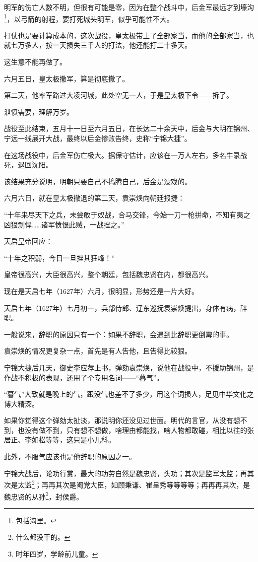 \begin{multicols}{\theparacolNo}
		明军的伤亡人数不明，但很有可能是零，因为在整个战斗中，后金军最远才到壕沟\footnote{包括沟里。}，以弓箭的射程，要打死城头明军，似乎可能性不大。

		打仗也是要计算成本的，这次战役，皇太极带上了全部家当，而他的全部家当，也就七万多人，按一天损失三千人的打法，他还能打二十多天。

		这生意不能再做了。

		六月五日，皇太极撤军，算是彻底撤了。

		第二天，他率军路过大凌河城，此处空无一人，于是皇太极下令——拆了。

		泄愤需要，理解万岁。

		战役至此结束，五月十一日至六月五日，在长达二十余天中，后金与大明在锦州、宁远一线展开大战，最终以后金惨败告终，史称“宁锦大捷”。

		在这场战役中，后金军伤亡极大。据保守估计，应该在一万人左右，多名牛录战死，退回沈阳。

		该结果充分说明，明朝只要自己不捣腾自己，后金是没戏的。

		六月六日，就在皇太极撤退的第二天，袁崇焕向朝廷报捷：

		“十年来尽天下之兵，未尝敢于奴战，合马交锋，今始一刀一枪拼命，不知有夷之凶狠剽悍……诸军愤恨此贼，一战挫之。”

		天启皇帝回应：

		“十年之积弱，今日一旦挫其狂峰！”

		皇帝很高兴，大臣很高兴，整个朝廷，包括魏忠贤在内，都很高兴。

		现在是天启七年（1627年）六月，很明显，形势还是一片大好。

		天启七年（1627年）七月初一，兵部侍郎、辽东巡抚袁崇焕提出，身体有病，辞职。

		一般说来，辞职的原因只有一个：如果不辞职，会遇到比辞职更倒霉的事。

		袁崇焕的情况更复杂一点，首先是有人告他，且告得比较狠。

		宁锦大捷后几天，御史李应荐上书，弹劾袁崇焕，说他在战役中，不援助锦州，是作战不积极的表现，还用了个专用名词——“暮气”。

		“暮气”大致就是晚上的气，跟没气也差不了多少，用这个词损人，足见中华文化之博大精深。

		如果你觉得这个弹劾太扯淡，那说明你还没见过世面。明代的言官，从没有想不到，也没有做不到，只有想不想做，啥理由都能找，啥人物都敢碰，相比以往的张居正、李如松等等，这只是小儿科。

		此外，不服气应该也是他辞职的原因之一。

		宁锦大战后，论功行赏，最大的功劳自然是魏忠贤，头功；其次是监军太监；再其次是太监\footnote{什么都没干的。}；再再其次是阉党大臣，如顾秉谦、崔呈秀等等等等；再再再其次，是魏忠贤的从孙\footnote{时年四岁，学龄前儿童。}，封侯爵。


\end{multicols}
